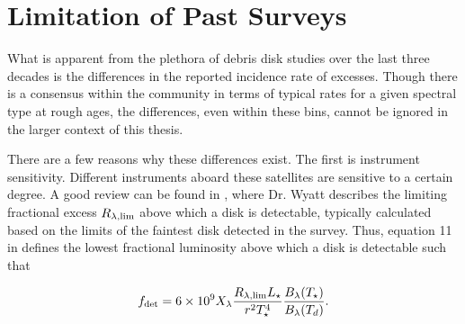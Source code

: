 \section{Limitation of Past Surveys}\label{sec:past_detection_context}
   
   What is apparent from the plethora of debris disk studies over the last three decades is the differences in the reported incidence rate of excesses. Though there is a consensus within the community in terms of typical rates for a given spectral type at rough ages, the differences, even within these bins, cannot be ignored in the larger context of this thesis. 
   
   There are a few reasons why these differences exist. The first is instrument sensitivity. Different instruments aboard these satellites are sensitive to a certain degree. A good review can be found in \citet{Wyatt2008}, where Dr. Wyatt describes the limiting fractional excess $R_{\lambda,\rm{lim}}$ above which a disk is detectable, typically calculated based on the limits of the faintest disk detected in the survey. Thus, equation 11 in \citet{Wyatt2008} defines the lowest fractional luminosity above which a disk is detectable such that
   
   \begin{equation}\label{eq:detection_limits}
   f_{\rm{det}} = 6\times10^9 X_\lambda \frac{R_{\lambda,{\rm lim}}L_\star}{r^2 T_\star^4} \frac{B_\lambda(T_\star)}{B_\lambda(T_d)}. 
   \end{equation}
   
